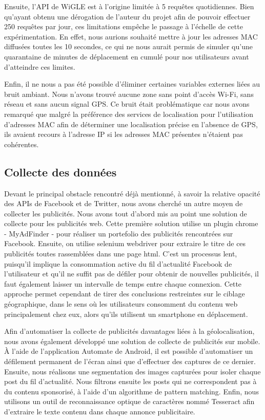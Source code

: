 \documentclass[runningheads]{llncs}
\begin{document}
Ensuite, l'API de WiGLE est à l'origine limitée à 5 requêtes quotidiennes. Bien qu'ayant obtenu une dérogation de l'auteur du projet afin de pouvoir effectuer 250 requêtes par jour, ces limitations empêche le passage à l'échelle de cette expérimentation. En effet, nous aurions souhaité mettre à jour les adresses MAC diffusées toutes les 10 secondes, ce qui ne nous aurait permis de simuler qu'une quarantaine de minutes de déplacement en cumulé pour nos utilisateurs avant d'atteindre ces limites.

Enfin, il ne nous a pas été possible d'éliminer certaines variables externes liées au bruit ambiant. Nous n'avons trouvé aucune zone sans point d'accès Wi-Fi, sans réseau et sans aucun signal GPS. Ce bruit était problématique car nous avons remarqué que malgré la préférence des services de localisation pour l'utilisation d'adresses MAC afin de déterminer une localisation précise en l'absence de GPS, ils avaient recours à l'adresse IP si les adresses MAC présentes n'étaient pas cohérentes.

\subsection{Collecte des données}

Devant le principal obstacle rencontré déjà mentionné, à savoir la relative opacité des APIs de Facebook et de Twitter, nous avons cherché un autre moyen de collecter les publicités. 
Nous avons tout d'abord mis au point une solution de collecte pour les publicités web. Cette première solution utilise un plugin chrome - MyAdFinder - pour réaliser un portefolio des publicités rencontrées sur Facebook. Ensuite, on utilise selenium webdriver pour extraire le titre de ces publicités toutes rassemblées dans une page html. C'est un processus lent, puisqu'il implique la consommation active du fil d'actualité Facebook de l'utilisateur et qu'il ne suffit pas de défiler pour obtenir de nouvelles publicités, il faut également laisser un intervalle de temps entre chaque connexion. 
Cette approche permet cependant de tirer des conclusions restreintes sur le ciblage géographique, dans le sens où les utilisateurs consomment du contenu web principalement chez eux, alors qu'ils utilisent un smartphone en déplacement.

Afin d'automatiser la collecte de publicités davantages liées à la géolocalisation, nous avons également développé une solution de collecte de publicités sur mobile. À l'aide de l'application Automate de Android, il est possible d'automatiser un défilement permanent de l'écran ainsi que d'effectuer des captures de ce dernier. Ensuite, nous réalisons une segmentation des images capturées pour isoler chaque post du fil d'actualité. Nous filtrons ensuite les posts qui ne correspondent pas à du contenu sponsorisé, à l'aide d'un algorithme de pattern matching. Enfin, nous utilisons un outil de reconnaissance optique de caractères nommé Tesseract afin d'extraire le texte contenu dans chaque annonce publicitaire.
\end{document}
